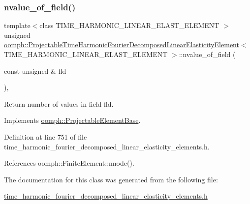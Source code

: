 \subsubsection{\texorpdfstring{nvalue\+\_\+of\+\_\+field()}{nvalue\_of\_field()}}
{\footnotesize\ttfamily template$<$class T\+I\+M\+E\+\_\+\+H\+A\+R\+M\+O\+N\+I\+C\+\_\+\+L\+I\+N\+E\+A\+R\+\_\+\+E\+L\+A\+S\+T\+\_\+\+E\+L\+E\+M\+E\+NT $>$ \\
unsigned \hyperlink{classoomph_1_1ProjectableTimeHarmonicFourierDecomposedLinearElasticityElement}{oomph\+::\+Projectable\+Time\+Harmonic\+Fourier\+Decomposed\+Linear\+Elasticity\+Element}$<$ T\+I\+M\+E\+\_\+\+H\+A\+R\+M\+O\+N\+I\+C\+\_\+\+L\+I\+N\+E\+A\+R\+\_\+\+E\+L\+A\+S\+T\+\_\+\+E\+L\+E\+M\+E\+NT $>$\+::nvalue\+\_\+of\+\_\+field (\begin{DoxyParamCaption}\item[{const unsigned \&}]{fld }\end{DoxyParamCaption})\hspace{0.3cm}{\ttfamily [inline]}, {\ttfamily [virtual]}}



Return number of values in field fld. 



Implements \hyperlink{classoomph_1_1ProjectableElementBase_a1a9a6de16f3511bca8e8be770abb9c2e}{oomph\+::\+Projectable\+Element\+Base}.



Definition at line 751 of file time\+\_\+harmonic\+\_\+fourier\+\_\+decomposed\+\_\+linear\+\_\+elasticity\+\_\+elements.\+h.



References oomph\+::\+Finite\+Element\+::nnode().



The documentation for this class was generated from the following file\+:\begin{DoxyCompactItemize}
\item 
\hyperlink{time__harmonic__fourier__decomposed__linear__elasticity__elements_8h}{time\+\_\+harmonic\+\_\+fourier\+\_\+decomposed\+\_\+linear\+\_\+elasticity\+\_\+elements.\+h}\end{DoxyCompactItemize}

